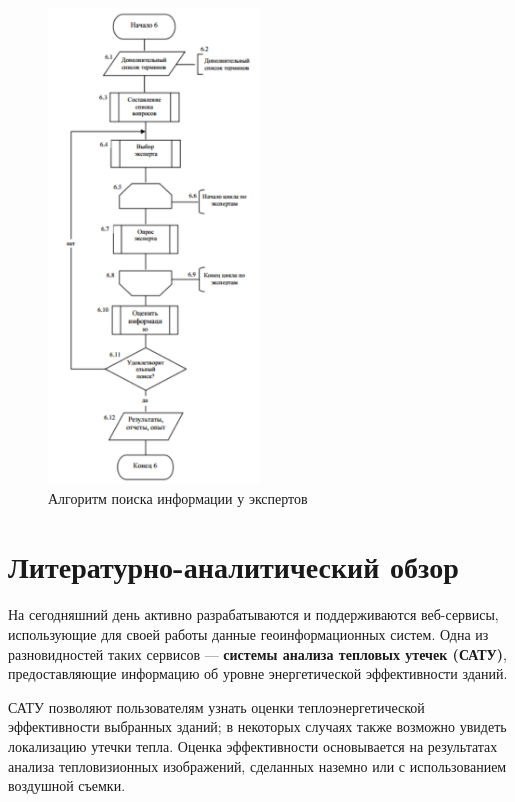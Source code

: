 	\begin{figure}[h!]
		\centering
		\includegraphics[width=0.5\textwidth]{images/searchinfo/4.png}
		\caption{Алгоритм поиска информации у экспертов}
		\label{searchinfo:4}
    \end{figure}

    \pagebreak

\section{Литературно-аналитический обзор}

\par

	На сегодняшний день активно разрабатываются и поддерживаются веб-сервисы, использующие для своей работы данные геоинформационных систем. Одна из разновидностей таких сервисов --- \textbf{системы анализа тепловых утечек (САТУ)}, предоставляющие информацию об уровне энергетической эффективности зданий.

	САТУ позволяют пользователям узнать оценки теплоэнергетической эффективности выбранных зданий; в некоторых случаях также возможно увидеть локализацию утечки тепла. Оценка эффективности основывается на результатах анализа тепловизионных изображений, сделанных наземно или с использованием воздушной съемки.
	

